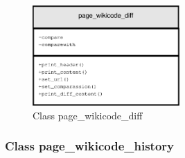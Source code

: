 \begin{itemize}
		\begin{figure}[h]
			\centering
			\includegraphics[width=0.5\textwidth]{./img/page_wikicode_diff.eps}
			\caption{Class page\_wikicode\_diff}
		\end{figure}
\end{itemize}

\subsubsection{Class page\_wikicode\_history}


